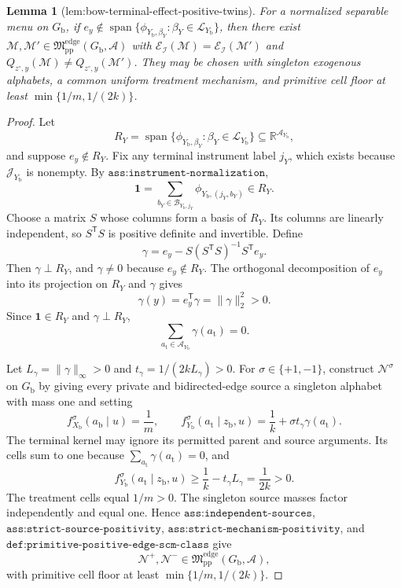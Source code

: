 \documentclass{article}
\newtheorem{lemma}{Lemma}
\begin{document}
\begin{lemma}[lem:bow-terminal-effect-positive-twins]\label{lem:bow-terminal-effect-positive-twins}
For a normalized separable menu on \(G_{\mathrm b}\), if \(e_y\notin\operatorname{span}\{\phi_{Y_{\mathrm b},\beta_Y}:\beta_Y\in\mathcal L_{Y_{\mathrm b}}\}\), then there exist \(\mathcal M,\mathcal M'\in\mathfrak M_{\mathrm{pp}}^{\mathrm{edge}}(G_{\mathrm b},\mathcal A)\) with \(\mathcal E_{\mathcal I}(\mathcal M)=\mathcal E_{\mathcal I}(\mathcal M')\) and \(Q_{z^{\circ},y}(\mathcal M)\ne Q_{z^{\circ},y}(\mathcal M')\). They may be chosen with singleton exogenous alphabets, a common uniform treatment mechanism, and primitive cell floor at least \(\min\{1/m,1/(2k)\}\).
\end{lemma}
\begin{proof}
Let
\[
R_Y=\operatorname{span}\{\phi_{Y_{\mathrm b},\beta_Y}:\beta_Y\in\mathcal L_{Y_{\mathrm b}}\}
\subseteq\mathbb R^{\mathcal A_{Y_{\mathrm b}}},
\]
and suppose \(e_y\notin R_Y\).  Fix any terminal instrument label \(j_Y\), which exists because \(\mathcal J_{Y_{\mathrm b}}\) is nonempty.  By \(\texttt{ass:instrument-normalization}\),
\[
\mathbf 1=\sum_{b_Y\in\mathcal B_{Y_{\mathrm b},j_Y}}
\phi_{Y_{\mathrm b},(j_Y,b_Y)}\in R_Y.
\]
Choose a matrix \(S\) whose columns form a basis of \(R_Y\).  Its columns are linearly independent, so \(S^{\mathsf T}S\) is positive definite and invertible.  Define
\[
\gamma=e_y-S(S^{\mathsf T}S)^{-1}S^{\mathsf T}e_y.
\]
Then \(\gamma\perp R_Y\), and \(\gamma\neq0\) because \(e_y\notin R_Y\).  The orthogonal decomposition of \(e_y\) into its projection on \(R_Y\) and \(\gamma\) gives
\[
\gamma(y)=e_y^{\mathsf T}\gamma=\lVert\gamma\rVert_2^2>0.
\]
Since \(\mathbf 1\in R_Y\) and \(\gamma\perp R_Y\),
\[
\sum_{a_{\mathrm t}\in\mathcal A_{Y_{\mathrm b}}}\gamma(a_{\mathrm t})=0.
\]

Let \(L_\gamma=\lVert\gamma\rVert_\infty>0\) and \(t_\gamma=1/(2kL_\gamma)>0\).  For \(\sigma\in\{+1,-1\}\), construct \(\mathcal N^\sigma\) on \(G_{\mathrm b}\) by giving every private and bidirected-edge source a singleton alphabet with mass one and setting
\[
f_{X_{\mathrm b}}^\sigma(a_{\mathrm b}\mid u)=\frac1m,
\qquad
f_{Y_{\mathrm b}}^\sigma(a_{\mathrm t}\mid z_{\mathrm b},u)
=\frac1k+\sigma t_\gamma\gamma(a_{\mathrm t}).
\]
The terminal kernel may ignore its permitted parent and source arguments.  Its cells sum to one because \(\sum_{a_{\mathrm t}}\gamma(a_{\mathrm t})=0\), and
\[
f_{Y_{\mathrm b}}^\sigma(a_{\mathrm t}\mid z_{\mathrm b},u)
\geq\frac1k-t_\gamma L_\gamma=\frac1{2k}>0.
\]
The treatment cells equal \(1/m>0\).  The singleton source masses factor independently and equal one.  Hence \(\texttt{ass:independent-sources}\), \(\texttt{ass:strict-source-positivity}\), \(\texttt{ass:strict-mechanism-positivity}\), and \(\texttt{def:primitive-positive-edge-scm-class}\) give
\[
\mathcal N^+,\mathcal N^-\in
\mathfrak M_{\mathrm{pp}}^{\mathrm{edge}}(G_{\mathrm b},\mathcal A),
\]
with primitive cell floor at least \(\min\{1/m,1/(2k)\}\).


\end{proof}
\end{document}
